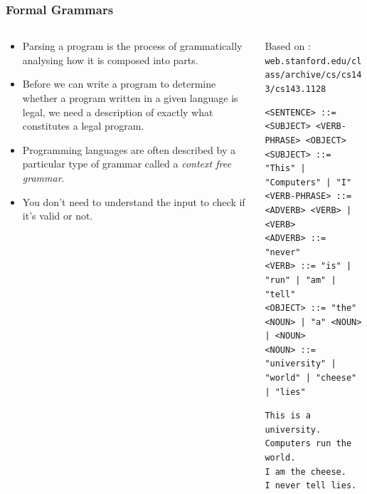 \begin{frame}[fragile]
\frametitle{Formal Grammars}
\begin{columns}[T]

\begin{column}{0.40\textwidth}
\begin{itemize}[<+->]
\item Parsing a program is the process of grammatically analysing how it is composed into parts.
\item Before we can write a program to determine whether a program
written in a given language is legal, we need a description of exactly
what constitutes a legal program.
\item Programming languages are often described by a particular type of
grammar called a {\it context free grammar}.
\item You don't need to understand the input to check if it's valid or not.
\end{itemize}
\end{column}

\pause
\begin{column}{0.50\textwidth}
{\footnotesize
Based on : \verb^web.stanford.edu/class/archive/cs/cs143/cs143.1128^

\begin{verbatim}
<SENTENCE> ::= <SUBJECT> <VERB-PHRASE> <OBJECT>
<SUBJECT> ::= "This" | "Computers" | "I"
<VERB-PHRASE> ::= <ADVERB> <VERB> | <VERB>
<ADVERB> ::= "never"
<VERB> ::= "is" | "run" | "am" | "tell"
<OBJECT> ::= "the" <NOUN> | "a" <NOUN> | <NOUN>
<NOUN> ::= "university" | "world" | "cheese" | "lies"
\end{verbatim}

\pause
\begin{verbatim}
This is a university.
Computers run the world.
I am the cheese.
I never tell lies.
\end{verbatim}
}
\end{column}

\end{columns}
\end{frame}


